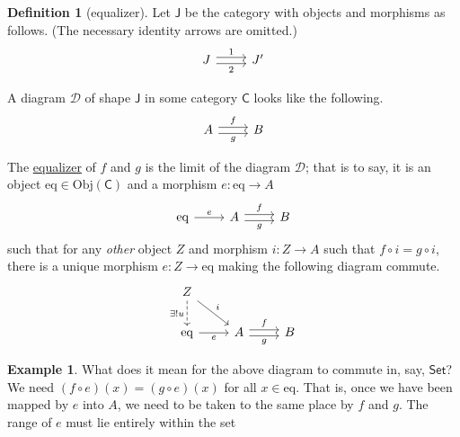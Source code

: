 \documentclass[a4paper]{report}
\newcommand{\defn}[1]{\ul{#1}}
\newcommand{\Obj}{\mathrm{Obj}}
\theoremstyle{definition}
\newtheorem{definition}{Definition}[section]
\newtheorem{example}{Example}[section]
\theoremstyle{plain}
\theoremstyle{remark}
\begin{document}
\begin{definition}[equalizer]
  \label{def:equalizer}
  Let $\mathsf{J}$ be the category with objects and morphisms as follows. (The necessary identity arrows are omitted.)
  \begin{equation*}
    \begin{tikzcd}
      J
      \arrow[r, shift left, "1"]
      \arrow[r, shift right, swap, "2"]
      & J'
    \end{tikzcd}
  \end{equation*}

  A diagram $\mathcal{D}$ of shape $\mathsf{J}$ in some category $\mathsf{C}$ looks like the following.
  \begin{equation*}
    \begin{tikzcd}
      A 
      \arrow[r, shift left, "f"]
      \arrow[r, shift right, swap, "g"]
      & B
    \end{tikzcd}
  \end{equation*}

  The \defn{equalizer} of $f$ and $g$ is the limit of the diagram $\mathcal{D}$; that is to say, it is an object $\mathrm{eq} \in \Obj(\mathsf{C})$ and a morphism $e\colon \mathrm{eq} \to A$
  \begin{equation*}
    \begin{tikzcd}
      \mathrm{eq}
      \arrow[r, "e"]
      & A
      \arrow[r, shift left, "f"]
      \arrow[r, shift right, swap, "g"]
      & B
    \end{tikzcd}
  \end{equation*}
  such that for any \emph{other} object $Z$ and morphism $i\colon Z \to A$ such that $f \circ i = g \circ i$, there is a unique morphism $e\colon Z \to \mathrm{eq}$ making the following diagram commute.
  \begin{equation*}
    \begin{tikzcd}
      Z 
      \arrow[d, swap, dashed, "\exists! u"]
      \arrow[dr, "i"]
      \\
      \mathrm{eq}
      \arrow[r, swap, "e"]
      & A
      \arrow[r, shift left, "f"]
      \arrow[r, shift right, swap, "g"]
      & B
    \end{tikzcd}
  \end{equation*}
\end{definition}
\begin{example}
  What does it mean for the above diagram to commute in, say, $\mathsf{Set}$? We need $(f \circ e)(x) = (g \circ e)(x)$ for all $x \in \mathrm{eq}$. That is, once we have been mapped by $e$ into $A$, we need to be taken to the same place by $f$ and $g$. The range of $e$ must lie entirely within the set 
\end{example}
\end{document}
